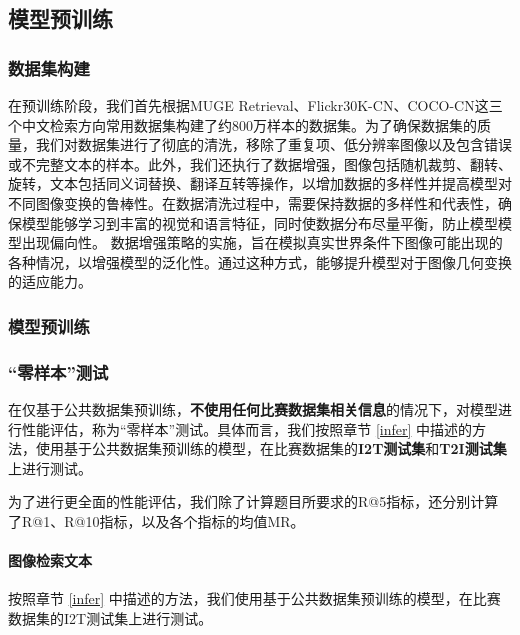 \documentclass[a4paper]{zreport}
\begin{document}
\subsection{模型预训练}

\subsubsection{数据集构建}
在预训练阶段，我们首先根据MUGE Retrieval、Flickr30K-CN、COCO-CN这三个中文检索方向常用数据集构建了约800万样本的数据集。为了确保数据集的质量，我们对数据集进行了彻底的清洗，移除了重复项、低分辨率图像以及包含错误或不完整文本的样本。此外，我们还执行了数据增强，图像包括随机裁剪、翻转、旋转，文本包括同义词替换、翻译互转等操作，以增加数据的多样性并提高模型对不同图像变换的鲁棒性。在数据清洗过程中，需要保持数据的多样性和代表性，确保模型能够学习到丰富的视觉和语言特征，同时使数据分布尽量平衡，防止模型模型出现偏向性。
数据增强策略的实施，旨在模拟真实世界条件下图像可能出现的各种情况，以增强模型的泛化性。通过这种方式，能够提升模型对于图像几何变换的适应能力。


\subsubsection{模型预训练}



\subsubsection{“零样本”测试}

在仅基于公共数据集预训练，\textbf{不使用任何比赛数据集相关信息}的情况下，对模型进行性能评估，称为“零样本”测试。具体而言，我们按照章节 \ref{infer} 中描述的方法，使用基于公共数据集预训练的模型，在比赛数据集的\textbf{I2T测试集}和\textbf{T2I测试集}上进行测试。

为了进行更全面的性能评估，我们除了计算题目所要求的R@5指标，还分别计算了R@1、R@10指标，以及各个指标的均值MR。

\paragraph{图像检索文本}

按照章节 \ref{infer} 中描述的方法，我们使用基于公共数据集预训练的模型，在比赛数据集的I2T测试集上进行测试。
\end{document}
